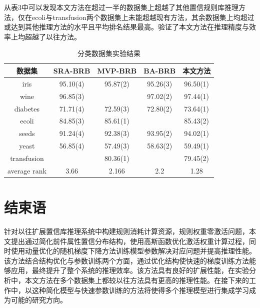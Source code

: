 \documentclass{cjc}
\begin{document}
从表3中可以发现本文方法在超过一半的数据集上超越了其他置信规则库推理方法，仅在ecoli与transfusion两个数据集上未能超越现有方法，其余数据集上均超过或达到其他推理方法的水平且平均排名结果最高。验证了本文方法在推理精度与效率上均超越了以往方法。
\begin{table}
    \centering
    \caption{分类数据集实验结果}
    \small{
        \begin{tabular}{ccccc}
            \toprule
            数据集       & SRA-BRB  & MVP-BRB  & BA-BRB   & 本文方法 \\
            \midrule
            iris         & 95.10(4) & 95.87(2) & 95.26(3) & 96.50(1) \\
            wine         & 96.85(3) &          & 97.02(2) & 97.44(1) \\
            diabetes     & 71.71(4) & 72.59(3) & 72.80(2) & 73.64(1) \\
            ecoli        & 84.85(3) & 85.61(1) &          & 85.43(2) \\
            seeds        & 91.24(4) & 92.38(3) & 93.95(2) & 94.02(1) \\
            yeast        & 56.85(4) & 57.49(3) & 58.63(2) & 59.49(1) \\
            transfusion  &          & 80.36(1) &          & 79.45(2) \\
            \midrule
            average rank & 3.66     & 2.166    & 2.2      & 1.28     \\
            \bottomrule
        \end{tabular}}
\end{table}

\section{结束语}
针对以往扩展置信库推理系统中构建规则消耗计算资源，规则权重零激活问题，本文提出通过简化前件属性置信分布结构，使用高斯函数优化激活权重计算过程，同时使用动量优化的随机梯度下降方法训练模型参数解决对应问题并提高推理性能。该方法结合结构优化与参数训练两个方面，通过优化结构使快速的梯度训练方法能够应用，最终提升了整个系统的推理效率。该方法具有良好的扩展性能，在实验分析中，本文方法在多个数据集上都较以往方法具有更高的推理性能。在接下来的工作中，以这种简化模型与快速参数训练的方法将使得多个推理模型进行集成学习成为可能的研究方向。


\nocite{*}




\newpage
\end{document}
